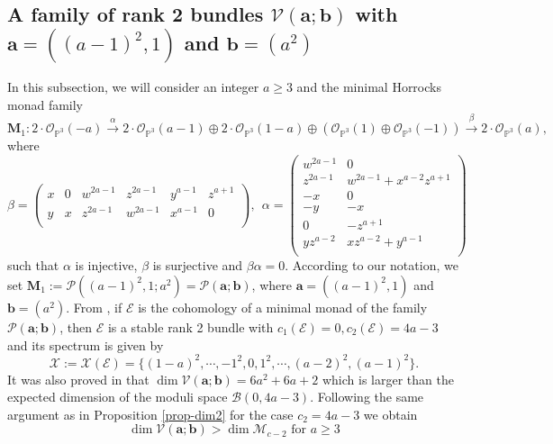 \documentclass[twoside,reqno]{amsart}
\theoremstyle{plain}
\newcommand{\op}[1]{{\mathcal O}_{\mathbb{P}^{#1}}}
\newcommand{\E}{\mathcal{E}}
\begin{document}
\subsection{A family of rank 2 bundles $\mathcal{V}(\boldsymbol{a};\boldsymbol{b})$ with $\boldsymbol{a}=({(a-1)}^2,1)$ and $\boldsymbol{b}=(a^2)$}\label{family2}
In this subsection, we will consider an integer $a\geq3$ and the minimal Horrocks monad family 
\begin{equation}\label{monad-1}
\mathbf{M}_1: 2\cdot\op3(-a)\stackrel{\alpha}\rightarrow2\cdot\op3(a-1)\oplus2\cdot\op3(1-a)\oplus(\op3(1)\oplus\op3(-1))\stackrel{\beta}\rightarrow2\cdot\op3(a),
\end{equation}
where 
$$\beta=\left(
\begin{array}{cccccc}
x& 0&w^{2a-1}& z^{2a-1}& y^{a-1}& z^{a+1}\\
y& x& z^{2a-1}& w^{2a-1}& x^{a-1}& 0\\
\end{array} \right), 
~~\alpha=\left(
\begin{array}{cc}
w^{2a-1}&0\\
z^{2a-1}&w^{2a-1}+x^{a-2}z^{a+1}\\
-x&0\\
-y&-x\\
0&-z^{a+1}\\
yz^{a-2}&xz^{a-2}+y^{a-1}\\
\end{array}
\right)$$
such that $\alpha$ is injective, $\beta$ is surjective and $\beta\alpha=0$. According to our notation, we set $\mathbf{M}_1:=\mathcal{P}({(a-1)}^2,1;a^2)=\mathcal{P}(\boldsymbol{a};\boldsymbol{b})$, where $\boldsymbol{a}=({(a-1)}^2,1)$ and $\boldsymbol{b}=(a^2)$. From \cite[Lemma 13]{F2024}, if $\E$ is the cohomology of a minimal monad of the family $\mathcal{P}(\boldsymbol{a};\boldsymbol{b})$, then $\E$ is a stable rank 2 bundle with $c_1(\E)=0, c_2(\E)=4a-3$ and its spectrum is given by
\begin{equation}\label{spectrum1}
 \mathcal{X}:=\mathcal{X}(\E)=\{{(1-a)}^2,\cdots,{-1}^2,0,1^2,\cdots,{(a-2)}^2, {(a-1)}^2\}.   
\end{equation}
It was also proved in \cite{F2024} that $\dim\mathcal{V}(\boldsymbol{a};\boldsymbol{b})=6a^2+6a+2$ which is larger 
than the expected dimension of the moduli space $\mathcal{B}(0,4a-3)$. Following the same argument as in Proposition 
\ref{prop-dim2} for the case $c_2=4a-3$ we obtain 
\begin{equation}\label{dim-4}
\dim\mathcal{V}(\boldsymbol{a};\boldsymbol{b})>\dim\mathcal{M}_{c-2} \mbox{ for } a\geq3    
\end{equation}
\end{document}
